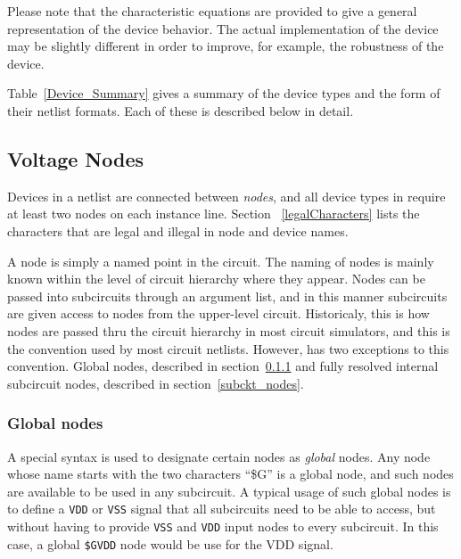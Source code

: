 Please note that the characteristic equations are
provided to give a general representation of the device behavior.  The actual
\Xyce{} implementation of the device may be slightly different in order to
improve, for example, the robustness of the device.

Table~\ref{Device_Summary} gives a summary of the device types and the form of
their netlist formats.  Each of these is described below in detail.





\clearpage
\subsection{Voltage Nodes}
\label{Voltage_Nodes}
  

Devices in a netlist are connected between {\em nodes}, and all device
types in \Xyce{} require at least two nodes on each instance line. Section
~\ref{legalCharacters} lists the characters that are legal and illegal in
\Xyce{} node and device names.

A node is simply a named point in the circuit.  The naming of nodes is mainly known within the level of circuit hierarchy where they appear.  Nodes can be passed into subcircuits through an argument list, and in this manner subcircuits are given access to nodes from the upper-level circuit.  Historicaly, this is how nodes are passed thru the circuit hierarchy in most circuit simulators, and this is the convention used by most circuit netlists.  However, \Xyce{} has two exceptions to this convention.  Global nodes, described in section~\ref{global_nodes} and fully resolved internal subcircuit nodes, described in section~\ref{subckt_nodes}.

\subsubsection{Global nodes}
\label{global_nodes}
A special syntax is used to designate certain nodes as {\em global}
nodes.  Any node whose name starts with the two characters ``\$G'' is
a global node, and such nodes are available to be used in any
subcircuit.  A typical usage of such global nodes is to define a \texttt{VDD}
or \texttt{VSS} signal that all subcircuits need to be able to access, but
without having to provide \texttt{VSS} and \texttt{VDD} input
nodes to every subcircuit.  In this case, a global \texttt{\$GVDD} node
would be use for the VDD signal.

